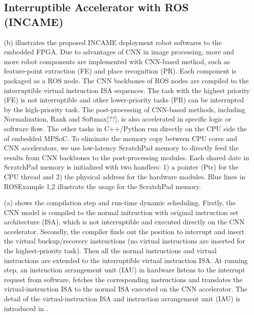 \subsection{ Interruptible Accelerator with ROS (INCAME) }


(b) illustrates the proposed INCAME deployment robot softwares to the embedded FPGA.
Due to advantages of CNN in image processing, more and more robot components are implemented with CNN-based method, such as feature-point extraction (FE) and place recognition (PR).
Each component is packaged as a ROS node.
The CNN backbones of ROS nodes are compiled to the  interruptible virtual instruction ISA sequences.
The task with the highest priority (FE) is not interruptible and other lower-priority tasks (PR) can be interrupted by the high-priority task. 
The post-processing of CNN-based methods, including Normalization, Rank and Softmax[??], is also accelerated in specific logic or software flow. The other tasks in C++/Python run directly on the CPU side the of embedded MPSoC\cite{MPSoC}. To eliminate the memory copy between CPU cores and CNN accelerators, we use low-latency ScratchPad memory \cite{Banakar2002Scratchpad} to directly feed the results from CNN backbones to the post-processing modules. Each shared date in ScratchPad memory is initialized with two handlers: 1) a pointer (Ptr) for the CPU thread and 2) the physical address for the hardware modules. Blue lines in  ROSExample 1,2 illustrate the usage for the ScratchPad memory.

(a) shows the compilation step and run-time dynamic scheduling. Firstly, the CNN model is compiled to the normal initruction with original instruction set architecture (ISA), which is not interruptible and executed directly on the CNN accelerator.
Secondly, the compiler finds out the position to interrupt and insert the virtual buckup/recovery instructions (no virtual instructions are inserted for the highest-priority task). 
Then all the normal instructions and virtual instructions are extended to the interruptible virtual instruction ISA. At running step, an instruction arrangement unit (IAU) in hardware listens to the interrupt request from software, fetches the corresponding instructions and translates the virtual-instruction ISA to the normal ISA executed on the CNN accelerator. 
The detail of the virtual-instruction ISA and instruction arrangement unit (IAU) is introduced in .

